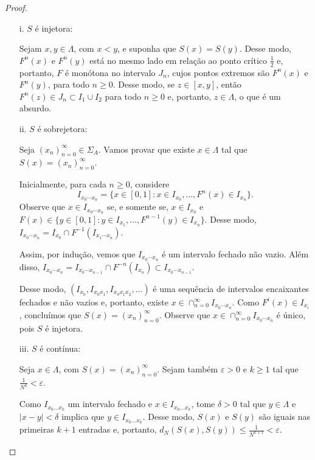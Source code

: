 \begin{proof}

\begin{enumerate}

\item[i.] $S$ é injetora:

Sejam $x, y \in \Lambda$, com $x < y$, e suponha que $S(x) = S(y)$. Desse modo, $F^n(x)$ e $F^n(y)$ está no mesmo lado em relação ao ponto crítico $\frac{1}{2}$ e, portanto, $F$ é monótona no intervalo $J_n$, cujos pontos extremos são $F^n(x)$ e $F^n(y)$, para todo $n \geq 0$. Desse modo, se $z \in [x, y]$, então $F^n(z) \in J_n \subset I_1 \cup I_2$ para todo $n \geq 0$ e, portanto, $z \in \Lambda$, o que é um absurdo.

\item[ii.] $S$ é sobrejetora:

Seja $(x_n)_{n=0}^\infty \in \Sigma_A$. Vamos provar que existe $x \in \Lambda$ tal que $S(x) = (x_n)_{n=0}^\infty$.

Inicialmente, para cada $n \geq 0$, considere
$$I_{x_0 \cdots x_n} = \{ x \in [0,1] : x \in I_{x_0}, \dots, F^n(x) \in I_{x_n} \}.$$
Observe que $x \in I_{x_0 \cdots x_n}$ se, e somente se, $x \in I_{x_0}$ e $F(x) \in \{ y \in [0,1] : y \in I_{x_1}, \dots, F^{n-1}(y) \in I_{x_n} \}$. Desse modo, $I_{x_0 \cdots x_n} = I_{x_0} \cap F^{-1}(I_{x_1 \cdots x_n})$.

Assim, por indução, vemos que $I_{x_0 \cdots x_n}$ é um intervalo fechado não vazio. Além disso, $I_{x_0 \cdots x_n} = I_{x_0 \cdots x_{n-1}} \cap F^{-n}(I_{x_n}) \subset I_{x_0 \cdots x_{n-1}}$.

Desse modo, $(I_{x_0}, I_{x_0 x_1}, I_{x_0 x_1 x_2}, \dots)$ é uma sequência de intervalos encaixantes fechados e não vazios e, portanto, existe $x \in \cap_{n=0}^\infty I_{x_0 \cdots x_n}$. Como $F^i(x) \in I_{x_i}$, concluímos que $S(x) = (x_n)_{n=0}^\infty$. Observe que $x \in \cap_{n=0}^\infty I_{x_0 \cdots x_n}$ é único, pois $S$ é injetora.

\item[iii.] $S$ é contínua:

Seja $x \in \Lambda$, com $S(x) = (x_n)_{n=0}^\infty$. Sejam também $\varepsilon > 0$ e $k \geq 1$ tal que $\frac{1}{N^k} < \varepsilon$.

Como $I_{x_0 \dots x_k}$ um intervalo fechado e $x \in I_{x_0 \dots x_k}$, tome $\delta > 0$ tal que $y \in \Lambda$ e $|x-y| < \delta$ implica que $y \in I_{x_0 \dots x_k}$. Desse modo, $S(x)$ e $S(y)$ são iguais nas primeiras $k+1$ entradas e, portanto, $d_N(S(x), S(y)) \leq \frac{1}{N^{k+1}} < \varepsilon$.

\end{enumerate}
\end{proof}


